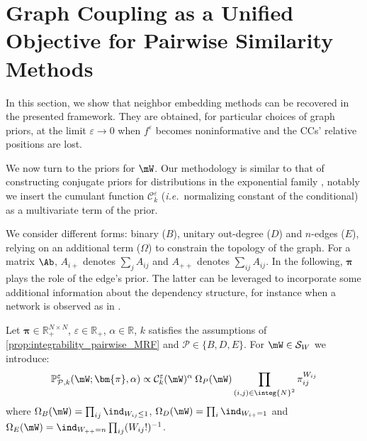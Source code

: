 \section{Graph Coupling as a Unified Objective for Pairwise Similarity Methods}\label{sec:GC_unified}

In this section, we show that neighbor embedding methods can be recovered in the presented framework. They are obtained, for particular choices of graph priors, at the limit $\varepsilon \to 0$ when $f^{\varepsilon}$ becomes noninformative and the CCs' relative positions are lost. 

We now turn to the priors for $\mW$. Our methodology is similar to that of constructing conjugate priors for distributions in the exponential family \citep{wainwright2008graphical}, notably we insert the cumulant function $\mathcal{C}_k^{\varepsilon}$ (\textit{i.e.}\ normalizing constant of the conditional) as a multivariate term of the prior. 

We consider different forms: binary ($B$), unitary out-degree ($D$) and $n$-edges ($E$), relying on an additional term ($\Omega$) to constrain the topology of the graph. For a matrix $\Ab$, $A_{i+}$ denotes $\sum_j A_{ij}$ and $A_{++}$ denotes $\sum_{ij} A_{ij}$. In the following, $\bm{\pi}$ plays the role of the edge's prior. The latter can be leveraged to incorporate some additional information about the dependency structure, for instance when a network is observed as in \citep{li2020high}. 

\begin{definition}\label{def:prior_W}
Let $\bm{\pi} \in \mathbb{R}_+^{N \times N}$, $\varepsilon \in \mathbb{R}_+$, $\alpha \in \mathbb{R}$, $k$ satisfies the assumptions of \cref{prop:integrability_pairwise_MRF} and $\mathcal{P} \in \{B,D,E\}$. For $\mW \in \mathcal{S}_{W}$ we introduce:
$$\mathbb{P}_{\mathcal{P},k}^{\varepsilon}(\mW; \bm{\pi}, \alpha) \propto \mathcal{C}^{\varepsilon}_k(\mW)^{\alpha} \: \Omega_{P}(\mW) \prod_{(i,j) \in \integ{N}^2} \pi_{ij}^{W_{ij}}$$
where $\Omega_{B}(\mW) = \prod_{ij} \ind_{W_{ij} \leq 1}$, $\Omega_{D}(\mW) = \prod_{i} \ind_{W_{i+} = 1}$ and $\Omega_{E}(\mW) = \ind_{W_{++} = n}\prod_{ij}(W_{ij}!)^{-1}$.
\end{definition}

